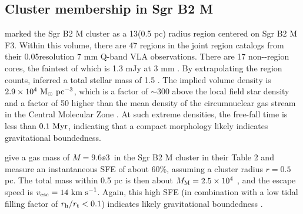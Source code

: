 \documentclass[twocolumn]{aastex62}
\begin{document}
\subsection{Cluster membership in Sgr B2 M}
\label{sec:mmass}
\citet{Schmiedeke2016a} marked the Sgr B2 M cluster as a 13\arcsec  (0.5 pc) radius
region centered on Sgr B2 M F3.  Within this volume, there are 47 \hii regions
in the joint  \hii region catalogs \citep{Gaume1995a,De-Pree2015a} from their
0.05\arcsec resolution 7 mm Q-band
VLA observations.  There are 17 non-\hii-region cores, the faintest of which is
1.3 mJy at 3 mm \citep{Ginsburg2018a}.  By extrapolating the \hii region counts,
\citet{Ginsburg2018a} inferred a total stellar mass of 1.5 \msun. The
implied volume density is $2.9\times10^4~\mathrm{M}_{\odot}~\mathrm{pc}^{-3}$, which is a factor of
$\sim300$ above the local field star density
\citep{Launhardt2002a,Kruijssen2015a} and a factor of 50 higher than the mean
density of the circumnuclear gas stream in the Central Molecular Zone
\citep[CMZ; e.g.][]{Longmore2013b}. At such extreme densities, the free-fall
time is less than $0.1~\mathrm{Myr}$, indicating that a compact morphology likely
indicates gravitational boundedness.

% 


\citet{Schmiedeke2016a} give a gas mass of $M=9.6\ee{3}$~\msun in the Sgr B2 M
cluster in their Table 2 and measure an instantaneous SFE of about 60\%, assuming
a cluster radius $r=0.5$ pc.  The total mass within 0.5 pc is then about $M_{\rm M} =
2.5\times10^{4}$ \msun, and the escape speed is $v_{\rm esc}=14~\textrm{km~s}^{-1}$. Again, this
high SFE (in combination with a low tidal filling factor of $r_{\rm h}/r_{\rm
t}<0.1$) indicates likely gravitational boundedness
\citep[e.g.][]{Baumgardt2007a,Kruijssen2012b}.
\end{document}
